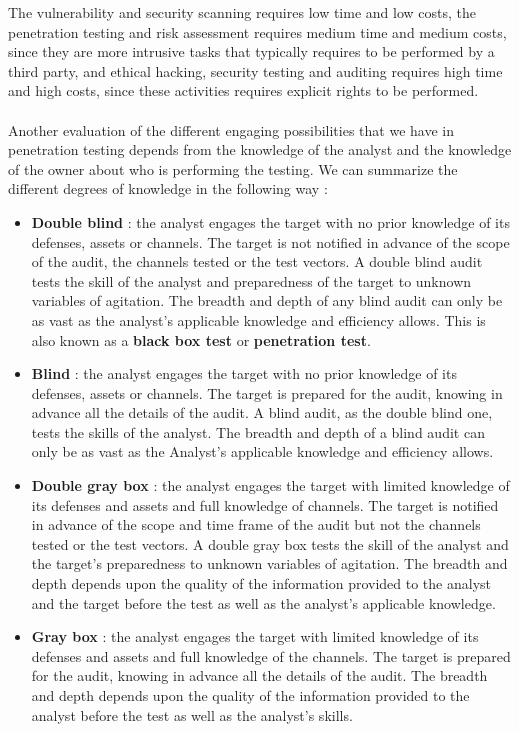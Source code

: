 \documentclass[11pt]{article}
\begin{document}
The vulnerability and security scanning requires low time and low costs, the penetration testing and risk assessment requires medium time and medium costs, since they are more intrusive tasks that typically requires to be performed by a third party, and ethical hacking, security testing and auditing requires high time and high costs, since these activities requires explicit rights to be performed.\\\\Another evaluation of the different engaging possibilities that we have in penetration testing depends from the knowledge of the analyst and the knowledge of the owner about who is performing the testing. We can summarize the different degrees of knowledge in the following way :
\begin{itemize}
\item \textbf{Double blind} : the analyst engages the target with no prior knowledge of its defenses, assets or channels. The target is not notified in advance of the scope of the audit, the channels tested or the test vectors. A double blind audit tests the skill of the analyst and preparedness of the target to unknown variables of agitation. The breadth and depth of any blind audit can only be as vast as the analyst's applicable knowledge and efficiency allows. This is also known as a \textbf{black box test} or \textbf{penetration test}.
\item \textbf{Blind} : the analyst engages the target with no prior knowledge of its defenses, assets or channels. The target is prepared for the audit, knowing in advance all the details of the audit. A blind audit, as the double blind one, tests the skills of the analyst. The breadth and depth of a blind audit can only be as vast as the Analyst’s applicable knowledge and efficiency allows.
\item \textbf{Double gray box} : the analyst engages the target with limited knowledge of its defenses and assets and full knowledge of channels. The target is notified in advance of the scope and time frame of the audit but not the channels tested or the test vectors. A double gray box tests the skill of the analyst and the target's preparedness to unknown variables of agitation. The breadth and depth depends upon the quality of the information provided to the analyst and the target before the test as well as the analyst's applicable knowledge.
\item \textbf{Gray box} : the analyst engages the target with limited knowledge of its defenses and assets and full knowledge of the channels. The target is prepared for the audit, knowing in advance all the details of the audit. The breadth and depth depends upon the quality of the information provided to the analyst before the test as well as the analyst's skills.

\end{itemize}
\end{document}

